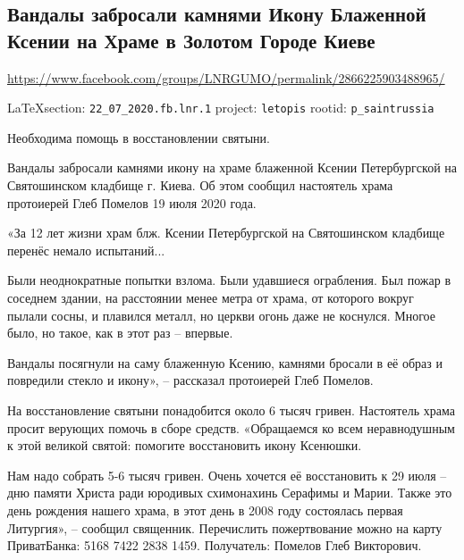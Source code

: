  
 

\subsection{Вандалы забросали камнями Икону Блаженной Ксении на Храме в Золотом Городе Киеве}
\url{https://www.facebook.com/groups/LNRGUMO/permalink/2866225903488965/}

\vspace{0.5cm}
{\small\LaTeX section: \verb|22_07_2020.fb.lnr.1| project: \verb|letopis| rootid: \verb|p_saintrussia|}
\vspace{0.5cm}

Необходима помощь в восстановлении святыни.

Вандалы забросали камнями икону на храме блаженной Ксении Петербургской на
Святошинском кладбище г. Киева.  Об этом сообщил настоятель храма протоиерей
Глеб Помелов 19 июля 2020 года.

«За 12 лет жизни храм блж. Ксении Петербургской на Святошинском кладбище
перенёс немало испытаний...

Были неоднократные попытки взлома.  Были удавшиеся ограбления. Был пожар в
соседнем здании, на расстоянии менее метра от храма, от которого вокруг пылали
сосны, и плавился металл, но церкви огонь даже не коснулся.  Многое было, но
такое, как в этот раз – впервые.

Вандалы посягнули на саму блаженную Ксению, камнями бросали в её образ и
повредили стекло и икону», – рассказал протоиерей Глеб Помелов.

На восстановление святыни понадобится около 6 тысяч гривен. Настоятель храма
просит верующих помочь в сборе средств.  «Обращаемся ко всем неравнодушным к
этой великой святой: помогите восстановить икону Ксенюшки.

Нам надо собрать 5-6 тысяч гривен. Очень хочется её восстановить к 29 июля –
дню памяти Христа ради юродивых схимонахинь Серафимы и Марии.  Также это день
рождения нашего храма, в этот день в 2008 году состоялась первая Литургия», –
сообщил священник.  Перечислить пожертвование можно на карту ПриватБанка: 5168
7422 2838 1459.  Получатель: Помелов Глеб Викторович.
  
